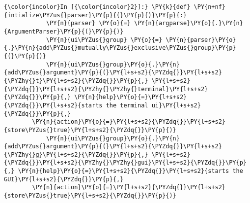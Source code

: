     \begin{Verbatim}[commandchars=\\\{\}]
{\color{incolor}In [{\color{incolor}2}]:} \PY{k}{def} \PY{n+nf}{intialize\PYZus{}parser}\PY{p}{(}\PY{p}{)}\PY{p}{:}
            \PY{n}{parser} \PY{o}{=} \PY{n}{argparse}\PY{o}{.}\PY{n}{ArgumentParser}\PY{p}{(}\PY{p}{)}
            \PY{n}{ui\PYZus{}group} \PY{o}{=} \PY{n}{parser}\PY{o}{.}\PY{n}{add\PYZus{}mutually\PYZus{}exclusive\PYZus{}group}\PY{p}{(}\PY{p}{)}
            \PY{n}{ui\PYZus{}group}\PY{o}{.}\PY{n}{add\PYZus{}argument}\PY{p}{(}\PY{l+s+s2}{\PYZdq{}}\PY{l+s+s2}{\PYZhy{}t}\PY{l+s+s2}{\PYZdq{}}\PY{p}{,} \PY{l+s+s2}{\PYZdq{}}\PY{l+s+s2}{\PYZhy{}\PYZhy{}terminal}\PY{l+s+s2}{\PYZdq{}}\PY{p}{,} \PY{n}{help}\PY{o}{=}\PY{l+s+s2}{\PYZdq{}}\PY{l+s+s2}{starts the terminal ui}\PY{l+s+s2}{\PYZdq{}}\PY{p}{,} 
		\PY{n}{action}\PY{o}{=}\PY{l+s+s2}{\PYZdq{}}\PY{l+s+s2}{store\PYZus{}true}\PY{l+s+s2}{\PYZdq{}}\PY{p}{)}
            \PY{n}{ui\PYZus{}group}\PY{o}{.}\PY{n}{add\PYZus{}argument}\PY{p}{(}\PY{l+s+s2}{\PYZdq{}}\PY{l+s+s2}{\PYZhy{}g}\PY{l+s+s2}{\PYZdq{}}\PY{p}{,} \PY{l+s+s2}{\PYZdq{}}\PY{l+s+s2}{\PYZhy{}\PYZhy{}gui}\PY{l+s+s2}{\PYZdq{}}\PY{p}{,} \PY{n}{help}\PY{o}{=}\PY{l+s+s2}{\PYZdq{}}\PY{l+s+s2}{starts the GUI}\PY{l+s+s2}{\PYZdq{}}\PY{p}{,} 
		\PY{n}{action}\PY{o}{=}\PY{l+s+s2}{\PYZdq{}}\PY{l+s+s2}{store\PYZus{}true}\PY{l+s+s2}{\PYZdq{}}\PY{p}{)}
        

\end{Verbatim}
